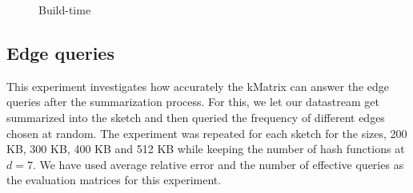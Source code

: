 \begin{figure}[htbp] 
    \centering
    \hfill
    \hfill
    \caption{Build-time}
    \label{fig:buildtime-test}
\end{figure}

\subsection{Edge queries}

This experiment investigates how accurately the kMatrix can answer the edge queries after the summarization process. For this, we let our datastream get summarized into the sketch and then queried the frequency of different edges chosen at random. The experiment was repeated for each sketch for the sizes, 200 KB, 300 KB, 400 KB and 512 KB while keeping the number of hash functions at \(d = 7\). We have used average relative error and the number of effective queries as the evaluation matrices for this experiment.

